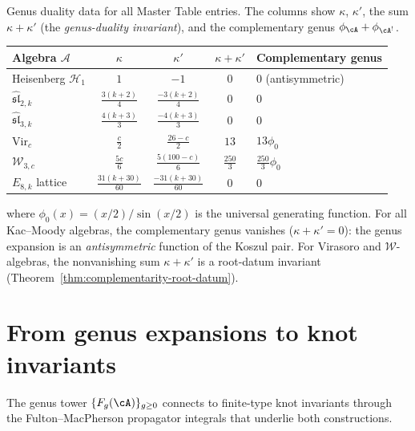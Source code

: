\begin{computation}\label{comp:genus-duality-table}
Genus duality data for all Master Table entries.
The columns show $\kappa$, $\kappa'$, the sum $\kappa + \kappa'$
(the \emph{genus-duality invariant}), and the complementary genus
$\phi_{\cA} + \phi_{\cA^!}$.
\begin{center}
\renewcommand{\arraystretch}{1.2}
\begin{tabular}{lcccl}
\toprule
Algebra $\mathcal{A}$ & $\kappa$ & $\kappa'$ & $\kappa + \kappa'$ & Complementary genus \\
\midrule
Heisenberg $\mathcal{H}_1$ & $1$ & $-1$ & $0$ & $0$ (antisymmetric) \\
$\widehat{\mathfrak{sl}}_{2,k}$ & $\frac{3(k+2)}{4}$ & $\frac{-3(k+2)}{4}$ & $0$ & $0$ \\
$\widehat{\mathfrak{sl}}_{3,k}$ & $\frac{4(k+3)}{3}$ & $\frac{-4(k+3)}{3}$ & $0$ & $0$ \\
$\mathrm{Vir}_c$ & $\frac{c}{2}$ & $\frac{26-c}{2}$ & $13$ & $13\phi_0$ \\
$\mathcal{W}_{3,c}$ & $\frac{5c}{6}$ & $\frac{5(100-c)}{6}$ & $\frac{250}{3}$ & $\frac{250}{3}\phi_0$ \\
$E_{8,k}$ lattice & $\frac{31(k+30)}{60}$ & $\frac{-31(k+30)}{60}$ & $0$ & $0$ \\
\bottomrule
\end{tabular}
\end{center}
where $\phi_0(x) = (x/2)/\sin(x/2)$ is the universal generating function.
For all Kac--Moody algebras, the complementary genus vanishes
\textup{(}$\kappa + \kappa' = 0$\textup{)}: the genus expansion is an
\emph{antisymmetric} function of the Koszul pair.  For Virasoro and
$\mathcal{W}$-algebras, the nonvanishing sum $\kappa + \kappa'$ is
a root-datum invariant
\textup{(}Theorem~\textup{\ref{thm:complementarity-root-datum})}.
\end{computation}


\section{From genus expansions to knot invariants}
\label{sec:genus-knot-invariants}

The genus tower $\{F_g(\cA)\}_{g \geq 0}$ connects to finite-type
knot invariants through the Fulton--MacPherson propagator integrals
that underlie both constructions.

